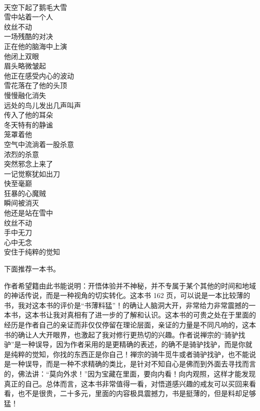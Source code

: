 \begin{poem}[壮哉杀念者]
    \begin{multicols}{3}
        \begin{center}~\\
            天空下起了鹅毛大雪 \\ 雪中站着一个人 \\ 纹丝不动 \\ 一场残酷的对决 \\ 正在他的脑海中上演 \\ 他闭上双眼 \\ 眉头略微皱起 \\ 他正在感受内心的波动 \\ 雪花落在了他的头顶 \\ 慢慢融化消失 \\ 远处的鸟儿发出几声叫声 \\ 传入了他的耳朵 \\ 冬天特有的静谧 \\ 笼罩着他 \\ 空气中流淌着一股杀意 \\ 浓烈的杀意 \\ 突然邪念上来了 \\ 一记觉察犹如出刀 \\ 快至毫巅 \\ 狂暴的心魔贼 \\ 瞬间被消灭 \\ 他还是站在雪中 \\ 纹丝不动 \\ 手中无刀 \\ 心中无念 \\ 安住于纯粹的觉知
        \end{center}
    \end{multicols}
\end{poem}

下面推荐一本书。

\begin{book}
    作者希望籍由此书能说明：开悟体验并不神秘，并不专属于某个其他的时间和地域的神话传说，而是一种视角的切实转化。这本书 162 页，可以说是一本比较薄的书，我对这本书的评价是“书薄料猛”！的确让人脑洞大开，非常给力非常震撼的一本书，这本书让我对真相有了进一步的了解和认识。这本书的可贵之处在于里面的经历是作者自己的亲证而非仅仅停留在理论层面，亲证的力量是不同凡响的，这本书的确让人大开眼界，也激起了我对修行更热切的兴趣。作者说禅宗的“骑驴找驴”是一种误导，因为作者采用的是更精确的表述，的确不是骑驴找驴，而是你就是纯粹的觉知，你找的东西正是你自己！禅宗的骑牛觅牛或者骑驴找驴，也不能说是一种误导，而是一种不求精确的类比，是针对不知自心是佛而到外面去寻找而言的，佛法讲：“莫向外求！”因为宝藏在里面，要向内看！向内观照，这样才能发现真正的自己。总体而言，这本书非常值得一看，对悟道感兴趣的戒友可以买回来看看，也不是很贵，二十多元，里面的内容极具震撼力，书是挺薄的，但是料却足够猛！
\end{book}
